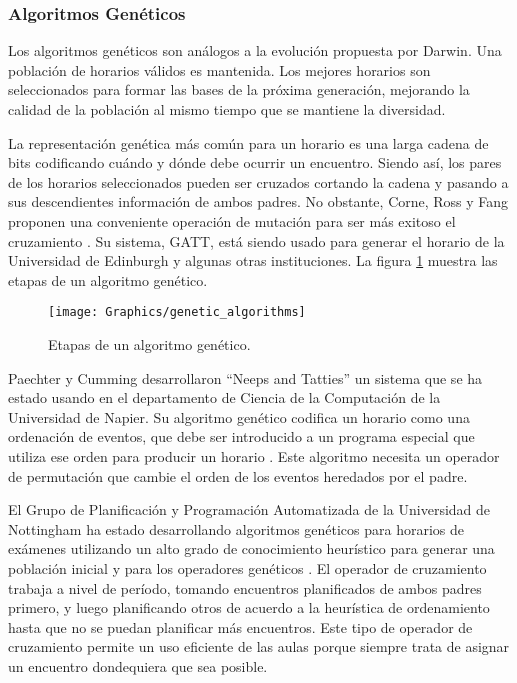 \subsubsection{Algoritmos Genéticos}

Los algoritmos genéticos son análogos a la evolución propuesta por Darwin. Una población de horarios válidos
es mantenida. Los mejores horarios son seleccionados para formar las bases de la próxima generación, mejorando
la calidad de la población al mismo tiempo que se mantiene la diversidad.

La representación genética más común para un horario es una larga cadena de bits codificando cuándo y dónde
debe ocurrir un encuentro. Siendo así, los pares de los horarios seleccionados pueden ser cruzados cortando
la cadena y pasando a sus descendientes información de ambos padres. No obstante, Corne, Ross y Fang proponen
una conveniente operación de mutación para ser más exitoso el cruzamiento \cite{D Corne and P Ross and HL Fang}.
Su sistema, GATT, está siendo usado para generar el horario de la Universidad de Edinburgh y algunas otras
instituciones. La figura \ref{genetic algorithms steps} muestra las etapas de un algoritmo gen\'etico.

\begin{figure}
	\begin{center}
		\texttt{[image: Graphics/genetic\_algorithms]}
		\caption{Etapas de un algoritmo genético.}	
		\label{genetic algorithms steps}	
	\end{center}	
\end{figure}

Paechter y Cumming desarrollaron ``Neeps and Tatties'' un sistema que se ha estado usando en el departamento
de Ciencia de la Computación de la Universidad de Napier. Su algoritmo genético codifica un horario como una ordenación
de eventos, que debe ser introducido a un programa especial que utiliza ese orden para producir un horario
\cite{B Paechter* and A Cumming* and H Luchian}. Este algoritmo necesita un operador de permutación 
que cambie el orden de los eventos heredados por el padre.

El Grupo de Planificación y Programación Automatizada de la Universidad de Nottingham ha estado desarrollando
algoritmos genéticos para horarios de exámenes utilizando un alto grado de conocimiento heurístico para generar
una población inicial y para los operadores genéticos \cite{EK Burke and DG Elliman and RF Weare 1, 
EK Burke and DG Elliman and RF Weare 2, EK Burke and DG Elliman and RF Weare 3}. El operador de cruzamiento
trabaja a nivel de período, tomando encuentros planificados de ambos padres primero, y luego planificando
otros de acuerdo a la heurística de ordenamiento hasta que no se puedan planificar más encuentros. Este tipo de operador de cruzamiento permite un uso eficiente de las aulas porque siempre trata de asignar un encuentro dondequiera que sea posible.

